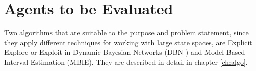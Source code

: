 \section{Agents to be Evaluated}
Two algorithms that are suitable to the purpose and problem statement, since they apply different techniques for working with large state spaces, are Explicit Explore or Exploit in Dynamic Bayesian Networks (DBN-\etre) and Model Based Interval Estimation (MBIE). They are described in detail in chapter \ref{ch:algo}. 





